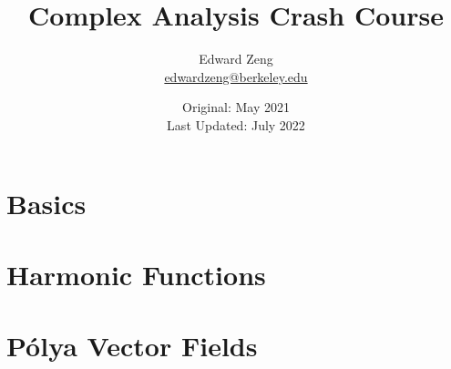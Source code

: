 \documentclass[letterpaper]{article}
\title{Complex Analysis Crash Course}
\author{Edward Zeng \\
        \href{mailto:edwardzeng@berkeley.edu}{edwardzeng@berkeley.edu}}
\date{Original: May 2021 \\
      Last Updated: July 2022}
\theoremstyle{definition} %
\begin{document}
\maketitle
\setcounter{tocdepth}{0}
\tableofcontents
\newpage

\part{Basics}


\newpage
\part{Harmonic Functions}


\newpage
\part{P\'olya Vector Fields}


\newpage


\end{document}
